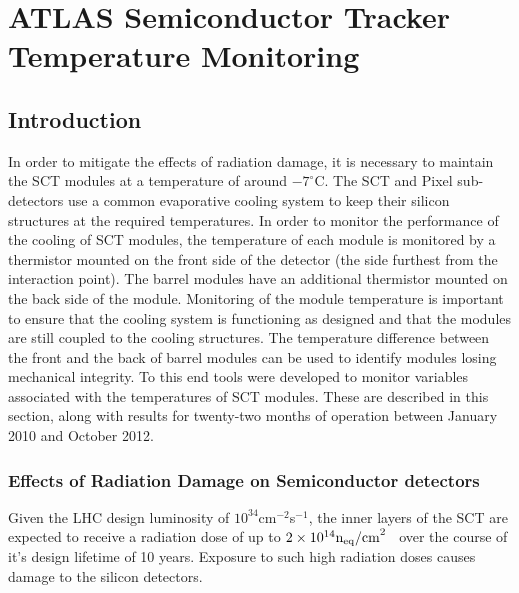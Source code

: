 \graphicspath{{Chapters/SCT/Figures/}}


\chapter{ATLAS Semiconductor Tracker Temperature Monitoring}
\label{chap:SCT}

\section{Introduction}

In order to mitigate the effects of radiation
damage, it is necessary to maintain the SCT modules at a temperature of around
$-7^{\circ}$C. The SCT and Pixel
sub-detectors use a common evaporative cooling system to keep their silicon
structures at the required temperatures. In order to monitor the
performance of the cooling of SCT modules, the temperature of
each module is monitored by a thermistor mounted on the front side of the
detector (the side furthest from the interaction point). The barrel modules have
an additional thermistor mounted on the back side of the module. Monitoring of
the module temperature is important to ensure that the cooling system is
functioning as designed and that the modules are still coupled to the cooling
structures. The temperature difference between the front and the back of barrel
modules can be used to identify modules losing mechanical integrity. To this end
tools were developed to monitor variables associated with the temperatures of
SCT modules. These are described in this section, along with results for
twenty-two months of operation between January 2010 and October 2012. 


\subsection{Effects of Radiation Damage on Semiconductor detectors}
Given the LHC design luminosity of $10^{34}$cm$^{-2}$s$^{-1}$, the
inner layers of the 
SCT are expected to receive a radiation dose of up to
$2\times10^{14}\rm{n_{eq}/cm}^2$~\cite{Ahmad200798} over the course of it's design
lifetime of 10 years.
Exposure to such high radiation doses causes damage to the silicon detectors. 

